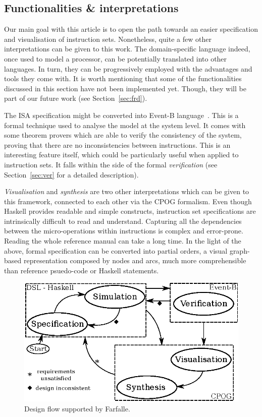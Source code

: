 \documentclass[conference]{IEEEtran}
\begin{document}
\subsection{Functionalities \& interpretations}
\label{sec:func}
Our main goal with this article is to open the path towards an easier specification and
visualisation of instruction sets. Nonetheless, quite a few other interpretations can be
given to this work. The domain-specific language indeed, once used to model
a processor, can be potentially translated into other languages. In turn, they
can be progressively employed with the advantages and tools they come with. It is worth
mentioning that some of the functionalities discussed in this section have not been
implemented yet. Though, they will be part of our future work (see Section~\ref{sec:frd}).

The ISA specification might be converted into Event-B language~\cite{eventB}. This is a
formal technique used to analyse the model at the system level. It comes with some theorem
provers which are able to verify the consistency of the system, proving that there are 
no inconsistencies between instructions. This is an interesting feature itself, which could
be particularly useful when applied to instruction sets. It falls within the side of the
formal \textit{verification} (see Section~\ref{sec:ver} for a detailed description).

\textit{Visualisation} and \textit{synthesis} are two other
interpretations which can be given to this framework, connected to each other via the
CPOG formalism. Even though Haskell provides readable and simple constructs, instruction
set specifications are intrinsically difficult to read and understand.
Capturing all the dependencies between the micro-operations within instructions is
complex and error-prone. Reading the whole reference manual can take a long time.
In the light of the above, formal specification can be converted into partial orders,
a visual graph-based representation composed by nodes and arcs, much more comprehensible 
than reference psuedo-code or Haskell statements.

\begin{figure}[ht!]
\begin{center}
	\includegraphics[width=\linewidth]{IMG/flow.eps}
	\caption{Design flow supported by Farfalle.}
	\label{fig:flow}
\end{center}
\end{figure}
\end{document}
